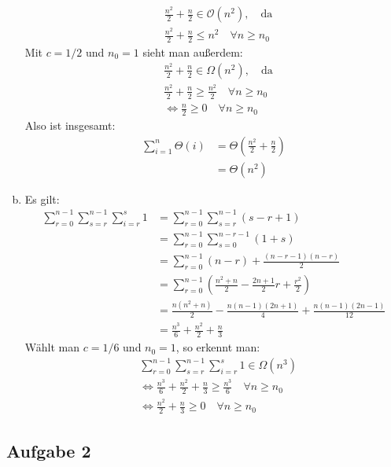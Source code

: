 \documentclass[11pt]{article}
\begin{document}
\begin{enumerate}[a)]
\begin{align*}
      &\frac{n^2}{2} + \frac{n}{2} \in \mathcal{O}(n^2),\quad\text{da}
      \\ &\frac{n^2}{2} + \frac{n}{2} \leq n^2 \quad\forall n \geq n_0
    \end{align*}
    Mit $c = 1/2$ und $n_0 = 1$ sieht man außerdem:
    \begin{align*}
      &\frac{n^2}{2} + \frac{n}{2} \in \Omega (n^2),\quad\text{da}
      \\ &\frac{n^2}{2} + \frac{n}{2} \geq\frac{n^2}{2}\quad\forall n\geq n_0
      \\ &\Leftrightarrow \frac{n}{2} \geq 0 \quad\forall n \geq n_0
    \end{align*}
    Also ist insgesamt:
    \begin{align*}
      \sum_{i=1}^n \Theta (i) &= \Theta \left(\frac{n^2}{2}+\frac{n}{2}\right)
      \\ &= \Theta (n^2)
    \end{align*}
  \item Es gilt:
    \begin{align*}
      \sum_{r=0}^{n-1} \sum_{s=r}^{n-1} \sum_{i=r}^{s} 1 &= \sum_{r=0}^{n-1}
        \sum_{s=r}^{n-1} (s-r+1)
      \\ &= \sum_{r=0}^{n-1} \sum_{s=0}^{n-r-1} (1+s)
      \\ &= \sum_{r=0}^{n-1} (n-r) + \frac{(n-r-1)(n-r)}{2}
      \\ &= \sum_{r=0}^{n-1} \left(\frac{n^2+n}{2}-\frac{2n+1}{2}r+
        \frac{r^2}{2}\right)
      \\ &= \frac{n(n^2+n)}{2}-\frac{n(n-1)(2n+1)}{4}+\frac{n(n-1)(2n-1)}{12}
      \\ &= \frac{n^3}{6} + \frac{n^2}{2} + \frac{n}{3}
    \end{align*}
     Wählt man $c = 1/6$ und $n_0 = 1$, so erkennt man:
     \begin{align*}
       &\sum_{r=0}^{n-1} \sum_{s=r}^{n-1} \sum_{i=r}^{s} 1 \in \Omega (n^3)
       \\ &\Leftrightarrow \frac{n^3}{6} + \frac{n^2}{2} + \frac{n}{3} \geq
         \frac{n^3}{6} \quad\forall n \geq n_0
       \\&\Leftrightarrow\frac{n^2}{2}+\frac{n}{3}\geq 0\quad\forall n\geq n_0
     \end{align*}
\end{enumerate}

\subsection*{Aufgabe 2}
%
\end{document}
